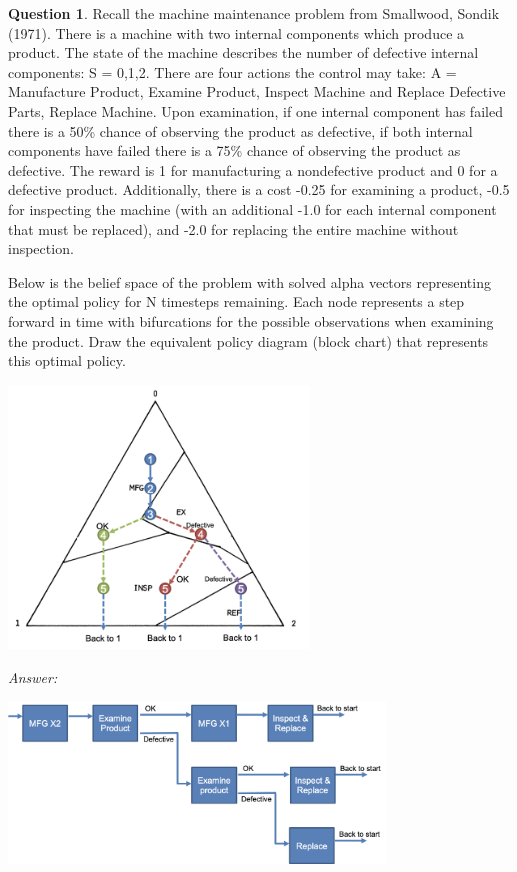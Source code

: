 \documentclass{article}
\theoremstyle{definition}
\newtheorem{question}[thm]{Question}
\newenvironment{answer}{\noindent\textit{Answer:}}{}
\begin{document}
\begin{question}
Recall the machine maintenance problem from Smallwood, Sondik (1971). There is a machine with two internal components which produce a product. The state of the machine describes the number of defective internal components: S = {0,1,2}. There are four actions the control may take: A = {Manufacture Product, Examine Product, Inspect Machine and Replace Defective Parts, Replace Machine}. Upon examination, if one internal component has failed there is a 50\% chance of observing the product as defective, if both internal components have failed there is a 75\% chance of observing the product as defective. The reward is 1 for manufacturing a nondefective product and 0 for a defective product. Additionally, there is a cost -0.25 for examining a product, -0.5 for inspecting the machine (with an additional -1.0 for each internal component that must be replaced), and -2.0 for replacing the entire machine without inspection.

Below is the belief space of the problem with solved alpha vectors representing the optimal policy for N timesteps remaining. Each node represents a step forward in time with bifurcations for the possible observations when examining the product. Draw the equivalent policy diagram (block chart) that represents this optimal policy.

\begin{center}
    \includegraphics[width=8cm]{smith_1.png}
\end{center}
\end{question}

\begin{answer} 
    \\
    \begin{center}
        \includegraphics[width=10cm]{smith_2.png}
    \end{center}
\end{answer}
\end{document}
